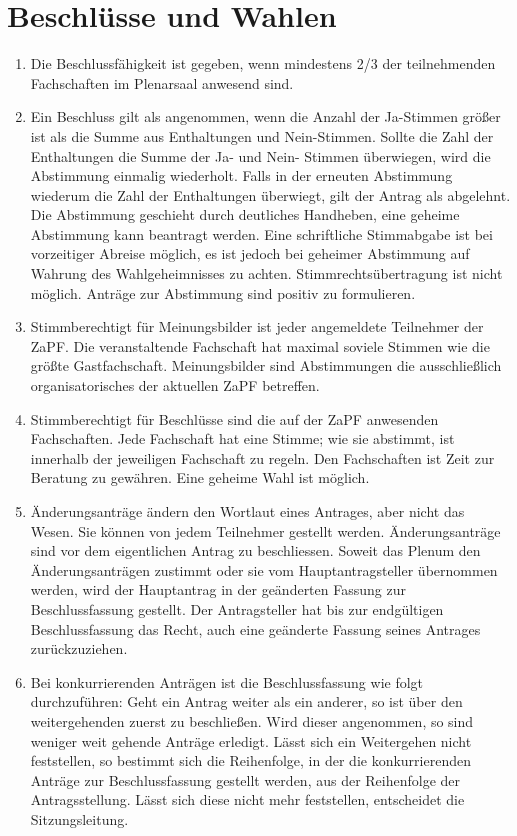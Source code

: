 \section*{Beschlüsse und Wahlen}
\begin{enumerate}
\item{Die Beschlussfähigkeit ist gegeben, wenn mindestens 2/3 der teilnehmenden Fachschaften im
Plenarsaal anwesend sind.}

\item{Ein Beschluss gilt als angenommen, wenn die Anzahl der Ja-Stimmen größer ist als die Summe aus
Enthaltungen und Nein-Stimmen. Sollte die Zahl der Enthaltungen die
Summe der Ja- und Nein- Stimmen überwiegen, wird die Abstimmung
einmalig wiederholt. Falls in der erneuten Abstimmung wiederum die
Zahl der Enthaltungen überwiegt, gilt der Antrag als abgelehnt. Die
Abstimmung geschieht durch deutliches Handheben, eine geheime
Abstimmung kann beantragt werden. Eine schriftliche Stimmabgabe ist
bei vorzeitiger Abreise möglich, es ist jedoch bei geheimer
Abstimmung auf Wahrung des Wahlgeheimnisses zu achten.
Stimmrechtsübertragung ist nicht möglich. Anträge zur Abstimmung
sind positiv zu formulieren.}

\item{Stimmberechtigt für Meinungsbilder ist jeder angemeldete Teilnehmer der ZaPF. Die
veranstaltende Fachschaft hat maximal soviele Stimmen wie die größte
Gastfachschaft. Meinungsbilder sind Abstimmungen die ausschließlich
organisatorisches der aktuellen ZaPF betreffen.}

\item{Stimmberechtigt für Beschlüsse sind die auf der ZaPF anwesenden Fachschaften. Jede Fachschaft hat
eine Stimme; wie sie abstimmt, ist innerhalb der jeweiligen
Fachschaft zu regeln. Den Fachschaften ist Zeit zur Beratung zu
gewähren. Eine geheime Wahl ist möglich.}

\item{Änderungsanträge ändern den Wortlaut eines Antrages, aber nicht das Wesen. Sie können von jedem
Teilnehmer gestellt werden. Änderungsanträge sind vor dem eigentlichen Antrag zu beschliessen.
Soweit das Plenum den Änderungsanträgen zustimmt oder sie vom Hauptantragsteller übernommen
werden, wird der Hauptantrag in der geänderten Fassung zur Beschlussfassung gestellt. Der
Antragsteller hat bis zur endgültigen Beschlussfassung das Recht, auch eine geänderte Fassung
seines Antrages zurückzuziehen.}

\item{Bei konkurrierenden Anträgen ist die Beschlussfassung wie folgt durchzuführen:
Geht ein Antrag weiter als ein anderer, so ist über den weitergehenden zuerst zu beschließen. Wird
dieser angenommen, so sind weniger weit gehende Anträge erledigt. Lässt sich ein Weitergehen
nicht feststellen, so bestimmt sich die Reihenfolge, in der die konkurrierenden Anträge zur
Beschlussfassung gestellt werden, aus der Reihenfolge der Antragsstellung. Lässt sich diese nicht
mehr feststellen, entscheidet die Sitzungsleitung.}


\end{enumerate}
